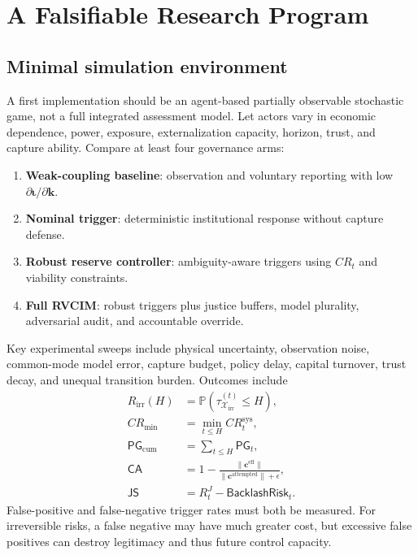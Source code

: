 \documentclass[11pt,a4paper]{article}
\numberwithin{equation}{section}
\theoremstyle{definition}
\theoremstyle{plain}
\theoremstyle{remark}
\newcommand{\Pp}{\mathbb{P}}
\newcommand{\irrev}{\mathcal{X}_{\mathrm{irr}}}
\newcommand{\kpi}{\bm{k}}
\newcommand{\capture}{\bm{c}}
\newcommand{\inst}{\bm{\iota}}
\begin{document}
\section{A Falsifiable Research Program}

\subsection{Minimal simulation environment}

A first implementation should be an agent-based partially observable stochastic game, not a full integrated assessment model. Let actors vary in economic dependence, power, exposure, externalization capacity, horizon, trust, and capture ability. Compare at least four governance arms:
\begin{enumerate}
  \item \textbf{Weak-coupling baseline}: observation and voluntary reporting with low $\partial\inst/\partial\kpi$.
  \item \textbf{Nominal trigger}: deterministic institutional response without capture defense.
  \item \textbf{Robust reserve controller}: ambiguity-aware triggers using $CR_t$ and viability constraints.
  \item \textbf{Full RVCIM}: robust triggers plus justice buffers, model plurality, adversarial audit, and accountable override.
\end{enumerate}

Key experimental sweeps include physical uncertainty, observation noise, common-mode model error, capture budget, policy delay, capital turnover, trust decay, and unequal transition burden. Outcomes include
\begin{align}
R_{\mathrm{irr}}(H)&=\Pp(\tau_{\irrev}^{(t)}\le H), \\
CR_{\min}&=\min_{t\le H}CR_t^{\mathrm{sys}}, \\
\mathsf{PG}_{\mathrm{cum}}&=\sum_{t\le H}\mathsf{PG}_t, \\
\mathsf{CA}&=1-\frac{\|\capture^{\mathrm{eff}}\|}{\|\capture^{\mathrm{attempted}}\|+\epsilon}, \\
\mathsf{JS}&=R_t^J-\mathsf{BacklashRisk}_t.
\end{align}
False-positive and false-negative trigger rates must both be measured. For irreversible risks, a false negative may have much greater cost, but excessive false positives can destroy legitimacy and thus future control capacity.
\end{document}
